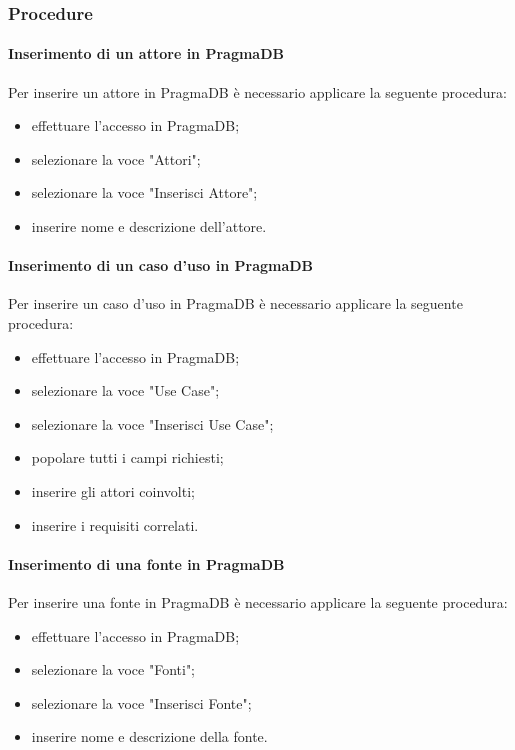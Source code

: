  \subsubsection{Procedure}
 \paragraph{Inserimento di un attore in PragmaDB}
 Per inserire un attore in PragmaDB è necessario applicare la seguente procedura:
 \begin{itemize}
 	\item effettuare l'accesso in PragmaDB;
 	\item selezionare la voce "Attori";
 	\item selezionare la voce "Inserisci Attore";
 	\item inserire nome e descrizione dell'attore.
 \end{itemize}
 \paragraph{Inserimento di un caso d'uso in PragmaDB}
 Per inserire un caso d'uso in PragmaDB è necessario applicare la seguente procedura:
 \begin{itemize}
 	\item effettuare l'accesso in PragmaDB;
 	\item selezionare la voce "Use Case";
 	\item selezionare la voce "Inserisci Use Case";
 	\item popolare tutti i campi richiesti;
 	\item inserire gli attori coinvolti;
 	\item inserire i requisiti correlati.
 \end{itemize}
 \paragraph{Inserimento di una fonte in PragmaDB}
 Per inserire una fonte in PragmaDB è necessario applicare la seguente procedura:
 \begin{itemize}
 	\item effettuare l'accesso in PragmaDB;
 	\item selezionare la voce "Fonti";
 	\item selezionare la voce "Inserisci Fonte";
 	\item inserire nome e descrizione della fonte.
 \end{itemize}
